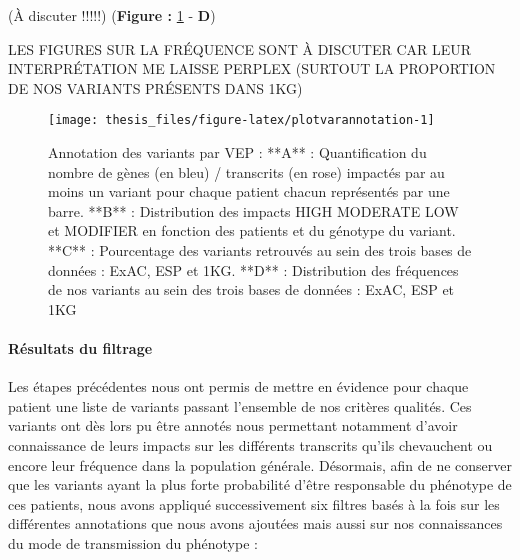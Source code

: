 \documentclass[12pt,twoside]{reedthesis}
\theoremstyle{definition}
\theoremstyle{definition}
\theoremstyle{remark}
\begin{document}
  (À discuter !!!!!) (\textbf{Figure : }\ref{fig:plotvarannotation} -
  \textbf{D})
  
  LES FIGURES SUR LA FRÉQUENCE SONT À DISCUTER CAR LEUR INTERPRÉTATION ME
  LAISSE PERPLEX (SURTOUT LA PROPORTION DE NOS VARIANTS PRÉSENTS DANS 1KG)
  
  \newpage
  
  \begin{figure}
  
  {\centering \texttt{[image: thesis\_files/figure-latex/plotvarannotation-1]} 
  
  }
  
  \caption[Annotation des variants par VEP]{Annotation des variants par VEP : **A** : Quantification du nombre de gènes (en bleu) / transcrits (en rose) impactés par au moins un variant pour chaque patient chacun représentés par une barre. **B** : Distribution des impacts HIGH MODERATE LOW et MODIFIER en fonction des patients et du génotype du variant. **C** : Pourcentage des variants retrouvés au sein des trois bases de données : ExAC, ESP et 1KG. **D** : Distribution des fréquences de nos variants au sein des trois bases de données : ExAC, ESP et 1KG}\label{fig:plotvarannotation}
  \end{figure}
  
  \newpage
  
  \hypertarget{filterdescription}{\paragraph{Résultats du
  filtrage}\label{filterdescription}}
  
  Les étapes précédentes nous ont permis de mettre en évidence pour chaque
  patient une liste de variants passant l'ensemble de nos critères
  qualités. Ces variants ont dès lors pu être annotés nous permettant
  notamment d'avoir connaissance de leurs impacts sur les différents
  transcrits qu'ils chevauchent ou encore leur fréquence dans la
  population générale. Désormais, afin de ne conserver que les variants
  ayant la plus forte probabilité d'être responsable du phénotype de ces
  patients, nous avons appliqué successivement six filtres basés à la fois
  sur les différentes annotations que nous avons ajoutées mais aussi sur
  nos connaissances du mode de transmission du phénotype :
  
\end{document}
